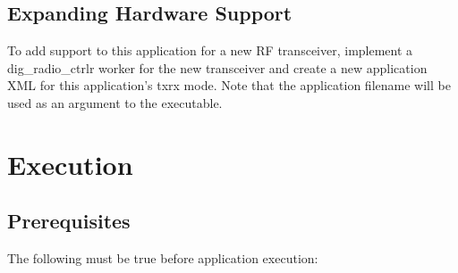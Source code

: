   \subsection{Expanding Hardware Support}
    To add support to this application for a
    new
    RF transceiver, implement a dig\_radio\_ctrlr worker for the new transceiver
    and
    create a new application XML for this application's
    txrx mode.
    Note that the application filename will be used as
    an argument to the executable.

\section{Execution}

  \begin{center}
  \end{center}

  \subsection{Prerequisites}

    The following must be true before application execution:

